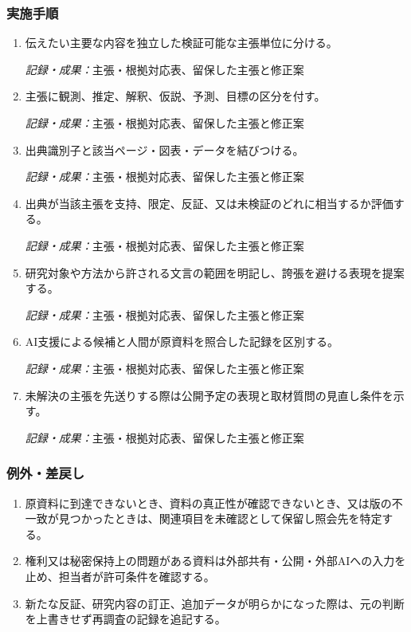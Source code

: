 \documentclass[a4paper,11pt]{article}
\begin{document}
\subsubsection*{実施手順}
\begin{enumerate}[leftmargin=2em,itemsep=0.65em]
\item 伝えたい主要な内容を独立した検証可能な主張単位に分ける。\par\noindent\textit{記録・成果：}主張・根拠対応表、留保した主張と修正案\nobreak\smallskip
\item 主張に観測、推定、解釈、仮説、予測、目標の区分を付す。\par\noindent\textit{記録・成果：}主張・根拠対応表、留保した主張と修正案\nobreak\smallskip
\item 出典識別子と該当ページ・図表・データを結びつける。\par\noindent\textit{記録・成果：}主張・根拠対応表、留保した主張と修正案\nobreak\smallskip
\item 出典が当該主張を支持、限定、反証、又は未検証のどれに相当するか評価する。\par\noindent\textit{記録・成果：}主張・根拠対応表、留保した主張と修正案\nobreak\smallskip
\item 研究対象や方法から許される文言の範囲を明記し、誇張を避ける表現を提案する。\par\noindent\textit{記録・成果：}主張・根拠対応表、留保した主張と修正案\nobreak\smallskip
\item AI支援による候補と人間が原資料を照合した記録を区別する。\par\noindent\textit{記録・成果：}主張・根拠対応表、留保した主張と修正案\nobreak\smallskip
\item 未解決の主張を先送りする際は公開予定の表現と取材質問の見直し条件を示す。\par\noindent\textit{記録・成果：}主張・根拠対応表、留保した主張と修正案\nobreak\smallskip
\end{enumerate}
\subsubsection*{例外・差戻し}
\begin{enumerate}[leftmargin=2em,itemsep=0.35em]
\item 原資料に到達できないとき、資料の真正性が確認できないとき、又は版の不一致が見つかったときは、関連項目を未確認として保留し照会先を特定する。
\item 権利又は秘密保持上の問題がある資料は外部共有・公開・外部AIへの入力を止め、担当者が許可条件を確認する。
\item 新たな反証、研究内容の訂正、追加データが明らかになった際は、元の判断を上書きせず再調査の記録を追記する。
\end{enumerate}
\end{document}
